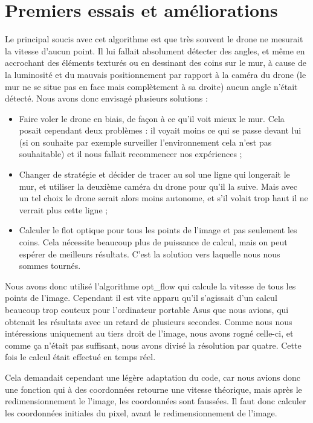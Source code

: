 \documentclass[titlepage,11pt,a4paper]{article}
\begin{document}
\section{Premiers essais et améliorations}
Le principal soucis avec cet algorithme est que très souvent le drone ne mesurait la vitesse d'aucun point. Il lui fallait absolument détecter des angles, et même en accrochant des éléments texturés ou en dessinant des coins sur le mur, à cause de la luminosité et du mauvais positionnement par rapport à la caméra du drone (le mur ne se situe pas en face mais complètement à sa droite) aucun angle n'était détecté. Nous avons donc envisagé plusieurs solutions :
\begin{itemize}
	\item Faire voler le drone en biais, de façon à ce qu'il voit mieux le mur. Cela posait cependant deux problèmes : il voyait moins ce qui se passe devant lui (si on souhaite par exemple surveiller l'environnement cela n'est pas souhaitable) et il nous fallait recommencer nos expériences ;
	\item Changer de stratégie et décider de tracer au sol une ligne qui longerait le mur, et utiliser la deuxième caméra du drone pour qu'il la suive. Mais avec un tel choix le drone serait alors moins autonome, et s'il volait trop haut il ne verrait plus cette ligne ;
	\item Calculer le flot optique pour tous les points de l'image et pas seulement les coins. Cela nécessite beaucoup plus de puissance de calcul, mais on peut espérer de meilleurs résultats. C'est la solution vers laquelle nous nous sommes tournés.
\end{itemize}

Nous avons donc utilisé l'algorithme opt\_flow qui calcule la vitesse de tous les points de l'image. Cependant il est vite apparu qu'il s'agissait d'un calcul beaucoup trop couteux pour l'ordinateur portable Asus que nous avions, qui obtenait les résultats avec un retard de plusieurs secondes. Comme nous nous intéressions uniquement au tiers droit de l'image, nous avons rogné celle-ci, et comme ça n'était pas suffisant, nous avons divisé la résolution par quatre. Cette fois le calcul était effectué en temps réel.

Cela demandait cependant une légère adaptation du code, car nous avions donc une fonction qui à des coordonnées retourne une vitesse théorique, mais après le redimensionnement le l'image, les coordonnées sont faussées. Il faut donc calculer les coordonnées initiales du pixel, avant le redimensionnement de l'image.
\end{document}
